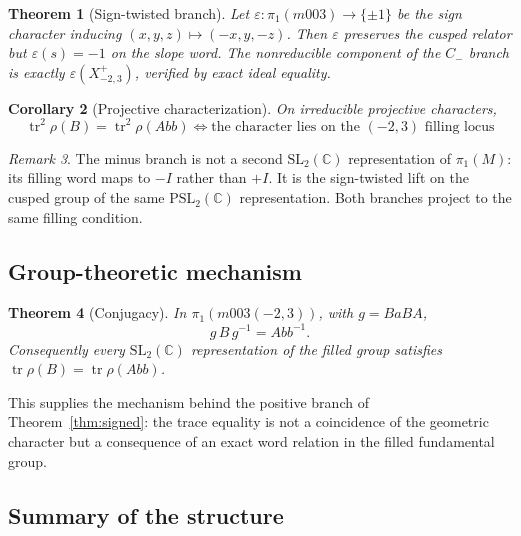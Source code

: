 \documentclass[11pt,a4paper]{article}
\newtheorem{theorem}{Theorem}[section]
\newtheorem{corollary}[theorem]{Corollary}
\theoremstyle{definition}
\theoremstyle{remark}
\newtheorem{remark}[theorem]{Remark}
\newcommand{\tr}{\operatorname{tr}}
\newcommand{\SLtwo}{\mathrm{SL}_2(\mathbb{C})}
\newcommand{\PSLtwo}{\mathrm{PSL}_2(\mathbb{C})}
\begin{document}
\begin{theorem}[Sign-twisted branch]
\label{thm:twist}
Let $\varepsilon: \pi_1(m003) \to \{\pm 1\}$ be the sign character
inducing $(x,y,z) \mapsto (-x, y, -z)$. Then $\varepsilon$ preserves
the cusped relator but $\varepsilon(s) = -1$ on the slope word. The
nonreducible component of the $C_-$ branch is exactly
$\varepsilon(X^{+}_{-2,3})$, verified by exact ideal equality.
\end{theorem}

\begin{corollary}[Projective characterization]
\label{cor:projective}
On irreducible projective characters,
\begin{equation}
\boxed{\;\tr^2\rho(B) = \tr^2\rho(Abb)
\iff \text{the character lies on the } (-2,3) \text{ filling locus}\;}
\end{equation}
\end{corollary}

\begin{remark}
The minus branch is not a second $\SLtwo$ representation of
$\pi_1(M)$: its filling word maps to $-I$ rather than $+I$. It is the
sign-twisted lift on the cusped group of the same $\PSLtwo$
representation. Both branches project to the same filling condition.
\end{remark}

\subsection{Group-theoretic mechanism}

\begin{theorem}[Conjugacy]
\label{thm:conj}
In $\pi_1(m003(-2,3))$, with $g = BaBA$,
\begin{equation}
g\, B\, g^{-1} = Abb^{-1} .
\end{equation}
Consequently every $\SLtwo$ representation of the filled group
satisfies $\tr\rho(B) = \tr\rho(Abb)$.
\end{theorem}

This supplies the mechanism behind the positive branch of
Theorem~\ref{thm:signed}: the trace equality is not a coincidence of
the geometric character but a consequence of an exact word relation in
the filled fundamental group.

\subsection{Summary of the structure}
\end{document}
